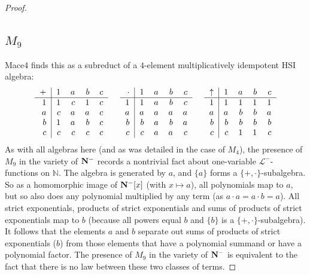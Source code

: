 \documentclass[eqnor,reqno]{amsart}
\theoremstyle{plain}
\theoremstyle{definition}
\begin{document}
\begin{proof}
\subsection{$M_9$}   Mace4 finds this as a subreduct of a $4$-element multiplicatively idempotent HSI algebra:
\[
\begin{tabular}{r|rrrr}
$+$ & 1 & $a$ & $b$ & $c$\\
\hline
    1 & 1 & $c$ & 1 & $c$ \\
    $a$ & $c$ & $a$ & $a$ & $c$ \\
    $b$ & 1 & $a$ & $b$ & $c$ \\
    $c$ & $c$ & $c$ & $c$ & $c$
\end{tabular} \hspace{.5cm}
\begin{tabular}{r|rrrr}
$\cdot$ & 1 & $a$ & $b$ & $c$\\
\hline
    1 & 1 & $a$ & $b$ & $c$ \\
    $a$ & $a$ & $a$ & $a$ & $a$ \\
    $b$ & $b$ & $a$ & $b$ & $a$ \\
    $c$ & $c$ & $a$ & $a$ & $c$
\end{tabular} \hspace{.5cm}
\begin{tabular}{r|rrrr}
$\uparrow$ & 1 & $a$ & $b$ & $c$\\
\hline
    1 & 1 & 1 & 1 & 1 \\
    $a$ & $a$ & $b$ & $b$ & $a$ \\
    $b$ & $b$ & $b$ & $b$ & $b$ \\
    $c$ & $c$ & 1 & 1 & $c$
\end{tabular}
\]
As with all algebras here (and as was detailed in the case of $M_4$), the presence of $M_{9}$ in the variety of ${\bf N}^-$ records a nontrivial fact about one-variable $\mathscr{L}^-$-functions on $\mathbb{N}$.  
The algebra is generated by $a$, and $\{a\}$ forms a $\{+,\cdot\}$-subalgebra.  
So as a homomorphic image of ${\bf N}^-[x]$ (with $x\mapsto a$), all polynomials map to $a$, but so also does any polynomial multiplied by any term (as $a\cdot a=a\cdot b=a$).  
All strict exponentials, products of strict exponentials and sums of products of strict exponentials map to $b$ (because all powers equal $b$ and $\{b\}$ is a $\{+,\cdot\}$-subalgebra).
It follows that the elements $a$ and $b$ separate out sums of products of strict exponentials ($b$) from those elements that have a polynomial summand or have a polynomial factor.  
The presence of $M_{9}$ in the variety of ${\bf N}^-$ is equivalent to the fact that there is no law between these two classes of terms.


\end{proof}
\end{document}
